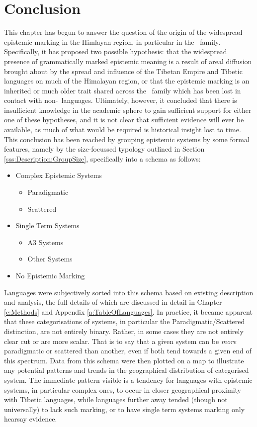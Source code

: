 \section{Conclusion}
This chapter has begun to answer the question of the origin of the widespread epistemic marking in the Himlayan region, in particular in the \lfam\ family. Specifically, it has proposed two possible hypothesis: that the widespread presence of grammatically marked epistemic meaning is a result of areal diffusion brought about by the spread and influence of the Tibetan Empire and Tibetic languages on much of the Himalayan region, or that the epistemic marking is an inherited or much older trait shared across the \lfam\ family which has been lost in contact with non-\lfam\ languages. Ultimately, however, it concluded that there is insufficient knowledge in the academic sphere to gain sufficient support for either one of these hypotheses, and it is not clear that sufficient evidence will ever be available, as much of what would be required is historical insight lost to time. This conclusion has been reached by grouping epistemic systems by some formal features, namely by the size-focussed typology outlined in Section \ref{sss:Description:GroupSize}, specifically into a schema as follows:
\begin{itemize}
    \item Complex Epistemic Systems
    \begin{itemize}
        \item Paradigmatic
        \item Scattered
    \end{itemize}
    \item Single Term Systems
    \begin{itemize}
        \item A3 Systems
        \item Other Systems
    \end{itemize}
    \item No Epistemic Marking
\end{itemize}
Languages were subjectively sorted into this schema based on existing description and analysis, the full details of which are discussed in detail in Chapter \ref{c:Methods} and Appendix \ref{a:TableOfLanguages}. In practice, it became apparent that these categorisations of systems, in particular the Paradigmatic/Scattered distinction, are not entirely binary. Rather, in some cases they are not entirely clear cut or are more scalar. That is to say that a given system can be \textit{more} paradigmatic or scattered than another, even if both tend towards a given end of this spectrum. Data from this schema were then plotted on a map to illustrate any potential patterns and trends in the geographical distribution of categorised system. The immediate pattern visible is a tendency for languages with epistemic systems, in particular complex ones, to occur in closer geographical proximity with Tibetic languages, while languages further away tended (though not universally) to lack such marking, or to have single term systems marking only hearsay evidence.

